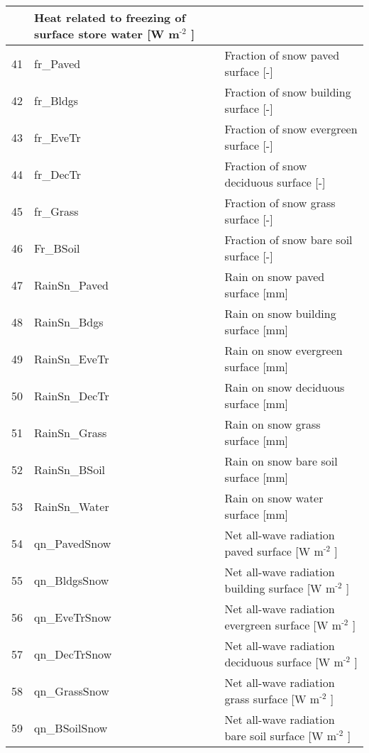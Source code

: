 \documentclass[letterpaper,10pt,english]{sphinxmanual}
\begin{document}
\begin{savenotes}
\begin{longtable}{|l|l|l|}
&
Heat related to freezing of surface store \textendash{} water {[}W m$^{\text{-2}}$ {]}
\\
\hline
41
&
fr\_Paved
&
Fraction of snow \textendash{} paved surface {[}-{]}
\\
\hline
42
&
fr\_Bldgs
&
Fraction of snow \textendash{} building surface {[}-{]}
\\
\hline
43
&
fr\_EveTr
&
Fraction of snow \textendash{} evergreen surface {[}-{]}
\\
\hline
44
&
fr\_DecTr
&
Fraction of snow \textendash{} deciduous surface {[}-{]}
\\
\hline
45
&
fr\_Grass
&
Fraction of snow \textendash{} grass surface {[}-{]}
\\
\hline
46
&
Fr\_BSoil
&
Fraction of snow \textendash{} bare soil surface {[}-{]}
\\
\hline
47
&
RainSn\_Paved
&
Rain on snow \textendash{} paved surface {[}mm{]}
\\
\hline
48
&
RainSn\_Bdgs
&
Rain on snow \textendash{} building surface {[}mm{]}
\\
\hline
49
&
RainSn\_EveTr
&
Rain on snow \textendash{} evergreen surface {[}mm{]}
\\
\hline
50
&
RainSn\_DecTr
&
Rain on snow \textendash{} deciduous surface {[}mm{]}
\\
\hline
51
&
RainSn\_Grass
&
Rain on snow \textendash{} grass surface {[}mm{]}
\\
\hline
52
&
RainSn\_BSoil
&
Rain on snow \textendash{} bare soil surface {[}mm{]}
\\
\hline
53
&
RainSn\_Water
&
Rain on snow \textendash{} water surface {[}mm{]}
\\
\hline
54
&
qn\_PavedSnow
&
Net all-wave radiation \textendash{} paved surface {[}W m$^{\text{-2}}$ {]}
\\
\hline
55
&
qn\_BldgsSnow
&
Net all-wave radiation \textendash{} building surface {[}W m$^{\text{-2}}$ {]}
\\
\hline
56
&
qn\_EveTrSnow
&
Net all-wave radiation \textendash{} evergreen surface {[}W m$^{\text{-2}}$ {]}
\\
\hline
57
&
qn\_DecTrSnow
&
Net all-wave radiation \textendash{} deciduous surface {[}W m$^{\text{-2}}$ {]}
\\
\hline
58
&
qn\_GrassSnow
&
Net all-wave radiation \textendash{} grass surface {[}W m$^{\text{-2}}$ {]}
\\
\hline
59
&
qn\_BSoilSnow
&
Net all-wave radiation \textendash{} bare soil surface {[}W m$^{\text{-2}}$ {]}
\\

\end{longtable}
\end{savenotes}
\end{document}
